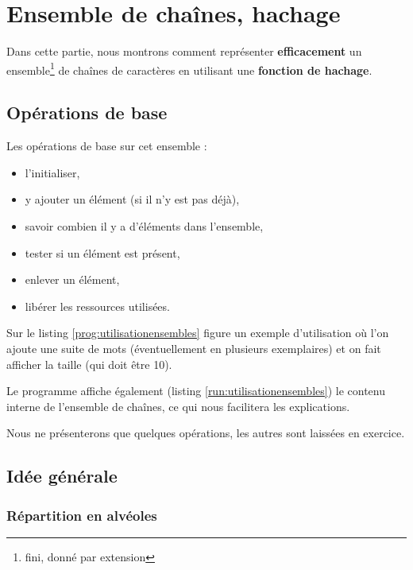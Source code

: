 \chapter{Ensemble de chaînes, hachage}


Dans cette partie, nous montrons comment représenter
\textbf{efficacement} un ensemble\footnote{fini, donné par extension}
de chaînes de caractères en utilisant une \textbf{fonction de
  hachage}.

\section{Opérations de base}
  
Les opérations de base sur cet ensemble :

\begin{itemize}
\item l'initialiser,
\item y ajouter un élément (si il n'y est pas déjà),
\item savoir combien il y a d'éléments dans l'ensemble,
\item tester si un élément est présent,
\item enlever un élément,
\item libérer les ressources utilisées.
\end{itemize}


Sur le listing \ref{prog:utilisationensembles} figure un exemple
d'utilisation où l'on ajoute une suite de mots (éventuellement
en plusieurs exemplaires) et on fait afficher la taille (qui doit être 10).

Le programme affiche également (listing
\ref{run:utilisationensembles})  le contenu interne de l'ensemble
de chaînes, ce qui nous facilitera les explications.
 




Nous ne présenterons que quelques opérations, les autres sont laissées en
exercice.


\section{Idée générale}


\subsection{Répartition en alvéoles}

